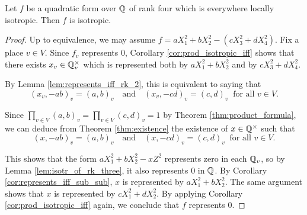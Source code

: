 \begin{lemma}\label{lem:isotr_of_rk_four}
\leanok
Let $f$ be a quadratic form over $\mathbb{Q}$ of rank four which is everywhere locally isotropic. Then $f$ is isotropic.
\end{lemma}
\begin{proof}
\leanok
Up to equivalence, we may assume $f = aX_1^2 + bX_2^2 - (cX_3^2 + dX_4^2)$. Fix a place $v \in V$. Since $f_v$ represents $0$, Corollary \ref{cor:prod_isotropic_iff} shows that there exists $x_v \in \mathbb{Q}_v^\times$ which is represented both by $aX_1^2 + bX_2^2$ and by  $cX_3^2 + dX_4^2$.

By Lemma \ref{lem:represents_iff_rk_2}, this is equivalent to saying that
\[ (x_v, -ab)_v = (a, b)_v \quad \text{and} \quad (x_v, -cd)_v = (c, d)_v \: \text{ for all } v \in V. \]

Since $\displaystyle \prod_{v \in V} (a, b)_v = \prod_{v \in V} (c, d)_v = 1$ by Theorem \ref{thm:product_formula}, we can deduce from Theorem \ref{thm:existence} the existence of $x \in \mathbb{Q}^\times$ such that
\[ (x, -ab)_v = (a, b)_v \quad \text{and} \quad (x, -cd)_v = (c, d)_v \: \text{ for all } v \in V. \]

This shows that the form $aX_1^2 + bX_2^2 - xZ^2$ represents zero in each $\mathbb{Q}_v$, so by Lemma \ref{lem:isotr_of_rk_three}, it also represents $0$ in $\mathbb{Q}$. By Corollary \ref{cor:represents_iff_sub_sub}, $x$ is represented by $aX_1^2 + bX_2^2$. The same argument shows that $x$ is represented by $cX_1^2 + dX_2^2$. By applying Corollary \ref{cor:prod_isotropic_iff} again, we conclude that $f$ represents $0$.
\end{proof}

